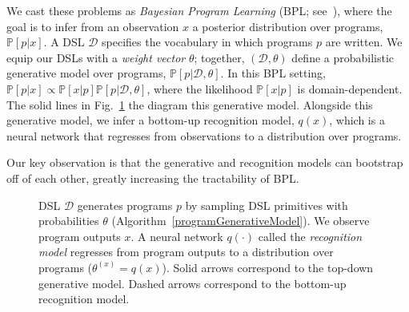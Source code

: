 \documentclass{article}
\newcommand{\probability}{\mathds{P}} %
\begin{document}
We cast these problems as \emph{Bayesian Program
  Learning} (BPL; see~\citep{lake2013one,ellis2016sampling,DBLP:conf/icml/LiangJK10}),
where the goal is to infer from an observation $x$ a posterior distribution over programs, $\probability[p|x]$.
A DSL $\mathcal{D}$ specifies the vocabulary in which programs $p$ are written.
We equip our DSLs with a \emph{weight vector} $\theta$; together, $(\mathcal{D},\theta)$
define a probabilistic generative model over programs, $\probability[p|\mathcal{D},\theta]$.
In this BPL setting, $\probability[p|x]\propto \probability[x|p]\probability[p|\mathcal{D},\theta]$,
where the likelihood $\probability[x|p]$ is domain-dependent.
The solid lines in Fig.~\ref{graphicalModel} the diagram this generative model.
Alongside this generative model,
we infer a bottom-up recognition model, $q(x)$, which is a neural network that regresses from observations to a distribution over programs.

Our key observation is that the generative and recognition models can bootstrap off of each other,
greatly increasing the tractability of BPL.


\begin{figure}
  \caption{DSL $\mathcal{D}$ generates programs $p$ by sampling DSL primitives with probabilities $\theta$ (Algorithm~\ref{programGenerativeModel}). We observe program outputs $x$. A neural network $q(\cdot )$ called the \emph{recognition model} regresses from program outputs to a distribution over programs ($\theta^{(x)} = q(x)$). Solid arrows correspond to the top-down generative model. Dashed arrows correspond to the bottom-up recognition model.}\label{graphicalModel}
\end{figure}
\end{document}
